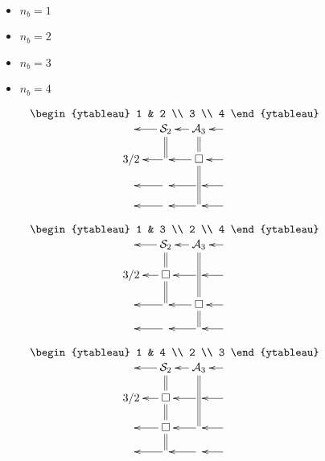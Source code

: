 \newcommand{\YTttwo}[0]{
$
\bcen
\text{
\begin{ytableau}
1 & 2
\\
3
\\
4
\end{ytableau}
}
\\
\xymatrix@R=1pc@C=1pc{
&\ar[l]\ar@2{-}[d]\cals_2
&\ar[l]\ar@2{-}[d]\cala_3
&\ar[l]
\\ 3/2
&\ar[l]
&\ar[l]\square \ar@2{-}[dd]
&\ar[l]
\\
&\ar[l]
&\ar[l]
&\ar[l]
\\
&\ar[l]&\ar[l]&\ar[l]
}\ecen
$
}

\newcommand{\YTtthree}[0]{
$
\bcen
\text{
\begin{ytableau}
1 & 3
\\
2
\\
4
\end{ytableau}
}
\\
\xymatrix@R=1pc@C=1pc{
&\ar[l]\ar@2{-}[d]\cals_2
&\ar[l]\ar@2{-}[dd]\cala_3
&\ar[l]
\\ 3/2
&\ar[l]\square \ar@2{-}[d]
&\ar[l]
&\ar[l]
\\
&\ar[l]
&\ar[l]\square \ar@2{-}[d]
&\ar[l]
\\
&\ar[l]&\ar[l]&\ar[l]
}\ecen
$
}

\newcommand{\YTtfour}[0]{
$
\bcen
\text{
\begin{ytableau}
1 & 4
\\
2
\\
3
\end{ytableau}
}
\\
\xymatrix@R=1pc@C=1pc{
&\ar[l]\ar@2{-}[d]\cals_2
&\ar[l]\ar@2{-}[dd]\cala_3
&\ar[l]
\\ 3/2
&\ar[l]\square \ar@2{-}[d]
&\ar[l]
&\ar[l]
\\
&\ar[l]\square \ar@2{-}[d]
&\ar[l]
&\ar[l]
\\
&\ar[l]&\ar[l]&\ar[l]
}\ecen
$
}



\begin{itemize}

\item $n_b=1$

\YTone

\item $n_b=2$

\YTs
\YTa

\item  $n_b=3$

\YTss

\YTsa
\quad\YTas

\YTaa

\item $n_b=4$

\YTss

\YTsFour
\quad\YTsaFour
\quad\YTasFour

\YTsquare
\quad\YTsquareP

\YTttwo
\quad\YTtthree
\quad\YTtfour

\YTaaa
\end{itemize}



